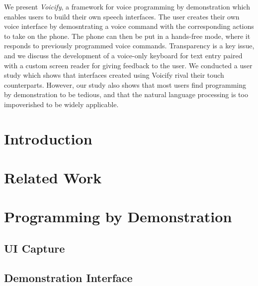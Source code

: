 \documentclass[letterpaper]{article}
\begin{document}
\abstract
We present \emph{Voicify}, a framework for voice programming by 
demonstration which enables users to build their own speech interfaces.
The user creates their own voice interface by demosntrating a voice command with the corresponding
actions to take on the phone. The phone can then be put in a hands-free mode, where it
responds to previously programmed voice commands. 
Transparency is a key issue, and we discuss the development of a voice-only keyboard for
text entry paired with a custom screen reader for giving feedback to the user.
We conducted a user study which shows that
interfaces created using Voicify rival their touch counterparts.
However, our study also shows that most users find programming by demonstration to be
tedious, and that the natural language processing is too impoverished to be widely applicable.

\section{Introduction}

\section{Related Work}

\section{Programming by Demonstration}
\subsection{UI Capture}

\subsection{Demonstration Interface}
\end{document}
